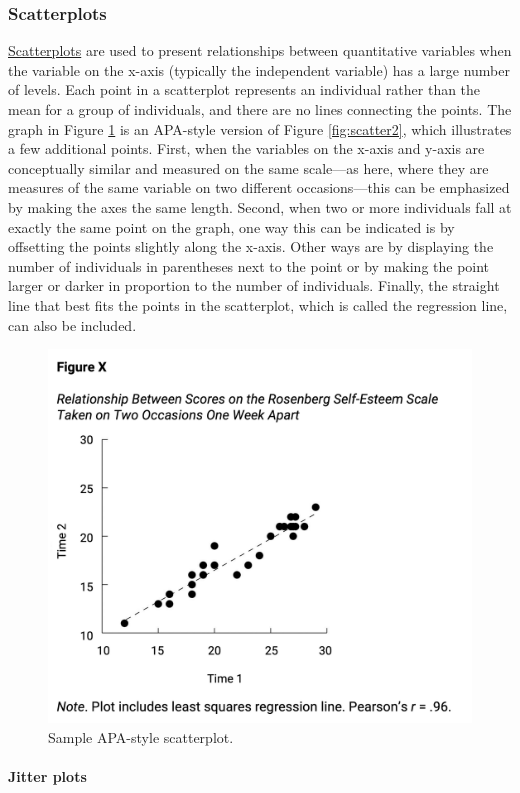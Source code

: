 \documentclass[
]{krantz}
\begin{document}
\hypertarget{scatterplots}{%
\subsubsection*{Scatterplots}\label{scatterplots}}


\protect\hyperlink{scatterplot}{Scatterplots} are used to present relationships between quantitative variables when the variable on the x-axis (typically the independent variable) has a large number of levels. Each point in a scatterplot represents an individual rather than the mean for a group of individuals, and there are no lines connecting the points. The graph in Figure \ref{fig:apascatter} is an APA-style version of Figure \ref{fig:scatter2}, which illustrates a few additional points. First, when the variables on the x-axis and y-axis are conceptually similar and measured on the same scale---as here, where they are measures of the same variable on two different occasions---this can be emphasized by making the axes the same length. Second, when two or more individuals fall at exactly the same point on the graph, one way this can be indicated is by offsetting the points slightly along the x-axis. Other ways are by displaying the number of individuals in parentheses next to the point or by making the point larger or darker in proportion to the number of individuals. Finally, the straight line that best fits the points in the scatterplot, which is called the regression line, can also be included.

\begin{figure}

{\centering \includegraphics[width=0.55\linewidth]{images/ch12/apascatter} 

}

\caption{Sample APA-style scatterplot.}\label{fig:apascatter}
\end{figure}

\hypertarget{jitter-plots}{%
\paragraph*{Jitter plots}\label{jitter-plots}}
\end{document}

